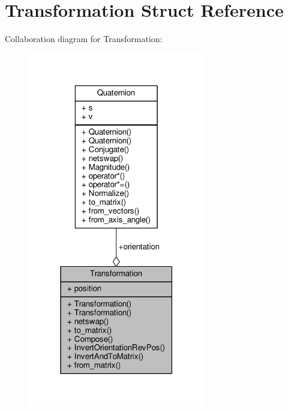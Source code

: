 \hypertarget{structTransformation}{}\section{Transformation Struct Reference}
\label{structTransformation}


Collaboration diagram for Transformation\+:
\nopagebreak
\begin{figure}[H]
\begin{center}
\leavevmode
\includegraphics[width=219pt]{d9/d32/structTransformation__coll__graph}
\end{center}
\end{figure}
